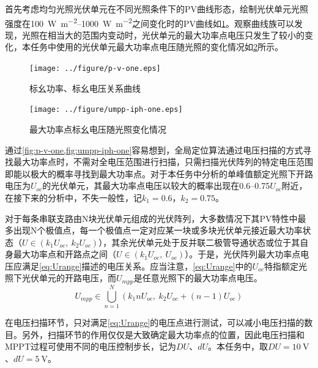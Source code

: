 \documentclass[a4paper,12pt]{article}
\begin{document}
    首先考虑均匀光照光伏单元在不同光照条件下的PV曲线形态，绘制光伏单元光照强度在\SIrange{100}{1000}{\watt\per\meter\squared}之间变化时的PV曲线如\cref{fig:p-v-one}。观察曲线族可以发现，光照在相当大的范围内变动时，光伏单元的最大功率点电压只发生了较小的变化，本任务中使用的光伏单元最大功率点电压随光照的变化情况如\cref{fig:umpp-iph-one}所示。
    \begin{figure}[htbp]
        \centering
        \texttt{[image: ../figure/p-v-one.eps]}
        \caption{标幺功率、标幺电压关系曲线}
        \label{fig:p-v-one}
    \end{figure}
    \begin{figure}[htbp]
        \centering
        \texttt{[image: ../figure/umpp-iph-one.eps]}
        \caption{最大功率点标幺电压随光照变化情况}
        \label{fig:umpp-iph-one}
    \end{figure}

    通过\cref{fig:p-v-one,fig:umpp-iph-one}容易想到，全局定位算法通过电压扫描的方式寻找最大功率点时，不需对全电压范围进行扫描，只需扫描光伏阵列的特定电压范围即能以极大的概率寻找到最大功率点。对于本任务中分析的单峰值额定光照下开路电压为$U_{oc}$的光伏单元，其最大功率点电压以较大的概率出现在\numrange{0.6}{0.75}$U_{oc}$附近，在接下来的分析中，不失一般性，记$k_1=0.6$，$k_2=0.75$。

    对于每条串联支路由N块光伏单元组成的光伏阵列，大多数情况下其PV特性中最多出现N个极值点\cite{项丽王冰-520}，每一个极值点一定对应某一块或多块光伏单元接近最大功率状态（$U\in\left(k_1U_{oc},\ k_2U_{oc}\right)$），其余光伏单元处于反并联二极管导通状态或位于其自身最大功率点和开路点之间（$U\in\left(k_1U_{oc},\ U_{oc}\right)$）。于是，光伏阵列最大功率点电压应满足\cref{eq:Urange}描述的电压关系。应当注意，\cref{eq:Urange}中的$U_{oc}$特指额定光照下光伏单元的开路电压，而$U_{mpp}$是任意光照下的最大功率点电压。
    \begin{equation}\label{eq:Urange}
      U_{mpp}\in\bigcup_{n=1}^{N}\left(k_1nU_{oc},\ k_2U_{oc}+\left(n-1\right)U_{oc}\right)
    \end{equation}

    在电压扫描环节，只对满足\cref{eq:Urange}的电压点进行测试，可以减小电压扫描的数目。另外，扫描环节的作用仅仅是大致确定最大功率点的位置，因此电压扫描和MPPT过程可使用不同的电压控制步长，记为$DU$、$dU$。本任务中，取$DU=\SI{10}{\volt}$、$dU=\SI{5}{\volt}$。
\end{document}
